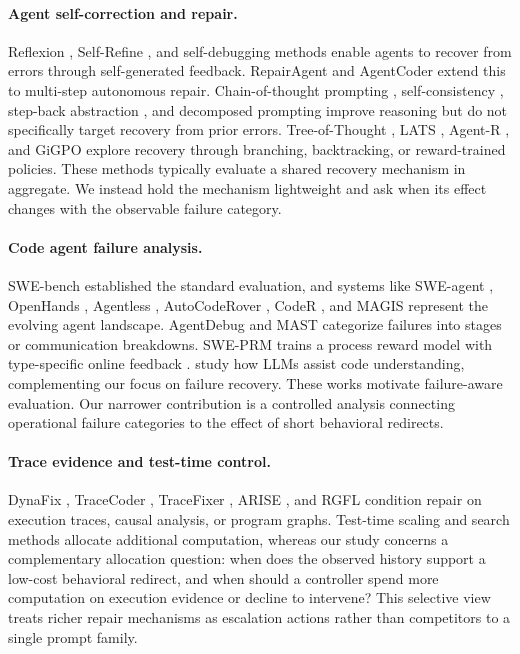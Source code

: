 \documentclass{article}
\begin{document}
\paragraph{Agent self-correction and repair.}
Reflexion \citep{shinn2023reflexion}, Self-Refine \citep{madaan2023selfrefine}, and self-debugging methods \citep{chen2023teaching, chen2025revisitselfdebugging, olausson2024repair} enable agents to recover from errors through self-generated feedback.
RepairAgent \citep{bouzenia2025repairagent} and AgentCoder \citep{huang2024agentcoder} extend this to multi-step autonomous repair.
Chain-of-thought prompting \citep{wei2022chain}, self-consistency \citep{wang2023selfconsistency}, step-back abstraction \citep{zheng2024stepback}, and decomposed prompting \citep{khot2023decomposed} improve reasoning but do not specifically target recovery from prior errors.
Tree-of-Thought \citep{yao2023tot}, LATS \citep{zhou2024lats}, Agent-R \citep{yuan2025agentr}, and GiGPO \citep{feng2025gigpo} explore recovery through branching, backtracking, or reward-trained policies.
These methods typically evaluate a shared recovery mechanism in aggregate.
We instead hold the mechanism lightweight and ask when its effect changes with
the observable failure category.

\paragraph{Code agent failure analysis.}
SWE-bench \citep{jimenez2024swebench} established the standard evaluation, and systems like SWE-agent \citep{yang2024sweagent}, OpenHands \citep{wang2024openhands}, Agentless \citep{xia2024agentless}, AutoCodeRover \citep{zhang2024autocoderover}, CodeR \citep{chen2024coder}, and MAGIS \citep{tao2024magis} represent the evolving agent landscape.
AgentDebug \citep{zhu2025agentdebug} and MAST \citep{cemri2025mast} categorize failures into stages or communication breakdowns.
SWE-PRM \citep{gandhi2025sweprm} trains a process reward model with type-specific online feedback \citep{lightman2024lets, uesato2022solving}.
\citet{nam2024using} study how LLMs assist code understanding, complementing our focus on failure recovery.
These works motivate failure-aware evaluation.  Our narrower contribution is a
controlled analysis connecting operational failure categories to the effect of
short behavioral redirects.

\paragraph{Trace evidence and test-time control.}
DynaFix \citep{huang2025dynafix}, TraceCoder \citep{huang2026tracecoder}, TraceFixer \citep{bouzenia2023tracefixer}, ARISE \citep{seddik2026arise}, and RGFL \citep{sepidband2026rgfl} condition repair on execution traces, causal analysis, or program graphs.
Test-time scaling and search methods allocate additional computation, whereas
our study concerns a complementary allocation question: when does the observed
history support a low-cost behavioral redirect, and when should a controller
spend more computation on execution evidence or decline to intervene?  This
selective view treats richer repair mechanisms as escalation actions rather
than competitors to a single prompt family.
\end{document}
